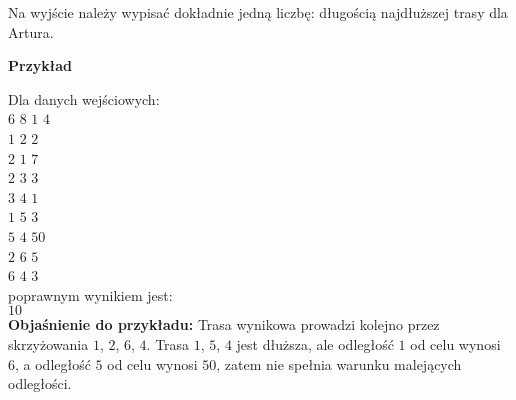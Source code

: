 \documentclass{article}
\begin{document}
	Na wyjście należy wypisać dokładnie jedną liczbę: długością najdłuższej trasy dla Artura.
	\begin{flushleft}
		\LARGE \textbf{Przykład}
	\end{flushleft}
	\smallskip 
	Dla danych wejściowych: \\
	$6$ $8$ $1$ $4$ \\
	$1$ $2$ $2$ \\
	$2$ $1$ $7$ \\
	$2$ $3$ $3$ \\
	$3$ $4$ $1$ \\
	$1$ $5$ $3$ \\
	$5$ $4$ $50$ \\
	$2$ $6$ $5$ \\
	$6$ $4$ $3$
	\smallskip \\
	poprawnym wynikiem jest: \\
	$10$
	\smallskip \\
	\textbf{Objaśnienie do przykładu:} Trasa wynikowa prowadzi kolejno przez skrzyżowania $1$, $2$, $6$, $4$. Trasa $1$, $5$, $4$ jest dłuższa, ale odległość $1$ od celu wynosi $6$, a odległość $5$ od celu wynosi $50$, zatem nie spełnia warunku malejących odległości.
\end{document}
